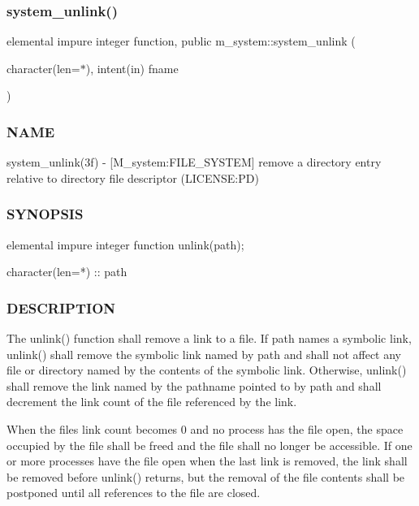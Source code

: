 \subsubsection{\texorpdfstring{system\+\_\+unlink()}{system\_unlink()}}
{\footnotesize\ttfamily elemental impure integer function, public m\+\_\+system\+::system\+\_\+unlink (\begin{DoxyParamCaption}\item[{character(len=$\ast$), intent(in)}]{fname }\end{DoxyParamCaption})}



\subsubsection*{N\+A\+ME}

system\+\_\+unlink(3f) -\/ \mbox{[}M\+\_\+system\+:F\+I\+L\+E\+\_\+\+S\+Y\+S\+T\+EM\mbox{]} remove a directory entry relative to directory file descriptor (L\+I\+C\+E\+N\+SE\+:PD) 

\subsubsection*{S\+Y\+N\+O\+P\+S\+IS}

\begin{DoxyVerb}elemental impure integer function unlink(path);

 character(len=*) :: path
\end{DoxyVerb}


\subsubsection*{D\+E\+S\+C\+R\+I\+P\+T\+I\+ON}

The unlink() function shall remove a link to a file. If path names a symbolic link, unlink() shall remove the symbolic link named by path and shall not affect any file or directory named by the contents of the symbolic link. Otherwise, unlink() shall remove the link named by the pathname pointed to by path and shall decrement the link count of the file referenced by the link.

When the file\textquotesingle{}s link count becomes 0 and no process has the file open, the space occupied by the file shall be freed and the file shall no longer be accessible. If one or more processes have the file open when the last link is removed, the link shall be removed before unlink() returns, but the removal of the file contents shall be postponed until all references to the file are closed.

